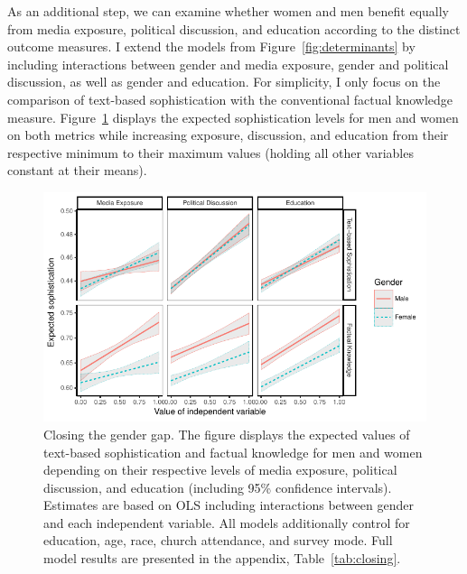 \documentclass[12pt]{article}
\begin{document}
As an additional step, we can examine whether women and men benefit equally from media exposure, political discussion, and education according to the distinct outcome measures. I extend the models from Figure~\ref{fig:determinants} by including interactions between gender and media exposure, gender and political discussion, as well as gender and education. For simplicity, I only focus on the comparison of text-based sophistication with the conventional factual knowledge measure. Figure~\ref{fig:closing} displays the expected sophistication levels for men and women on both metrics while increasing exposure, discussion, and education from their respective minimum to their maximum values (holding all other variables constant at their means).

\begin{figure}[h]\centering
\includegraphics{../fig/closing.pdf}
\caption{Closing the gender gap. The figure displays the expected values of text-based sophistication and factual knowledge for men and women depending on their respective levels of media exposure, political discussion, and education (including 95\% confidence intervals). Estimates are based on OLS including interactions between gender and each independent variable. All models additionally control for education, age, race, church attendance, and survey mode. Full model results are presented in the appendix, Table~\ref{tab:closing}.}\label{fig:closing}
\end{figure}
\end{document}
